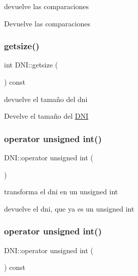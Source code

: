 devuelve las comparaciones 

Devuelve las comparaciones \mbox{\label{classDNI_a3e38336648ba2cea219c0558198fb7c4}} 
\subsubsection{\texorpdfstring{getsize()}{getsize()}}
{\footnotesize\ttfamily int D\+N\+I\+::getsize (\begin{DoxyParamCaption}{ }\end{DoxyParamCaption}) const}



devuelve el tamaño del dni 

Develve el tamaño del \hyperlink{classDNI}{D\+NI} \mbox{\label{classDNI_a15f0d23d04bb88088f095288a82605cf}} 
\subsubsection{\texorpdfstring{operator unsigned int()}{operator unsigned int()}\hspace{0.1cm}{\footnotesize\ttfamily [1/2]}}
{\footnotesize\ttfamily D\+N\+I\+::operator unsigned int (\begin{DoxyParamCaption}{ }\end{DoxyParamCaption})}



transforma el dni en un unsigned int 

devuelve el dni, que ya es un unsigned int \mbox{\label{classDNI_a8916089b50d31fd9e07c0adac1073153}} 
\subsubsection{\texorpdfstring{operator unsigned int()}{operator unsigned int()}\hspace{0.1cm}{\footnotesize\ttfamily [2/2]}}
{\footnotesize\ttfamily D\+N\+I\+::operator unsigned int (\begin{DoxyParamCaption}{ }\end{DoxyParamCaption}) const}



